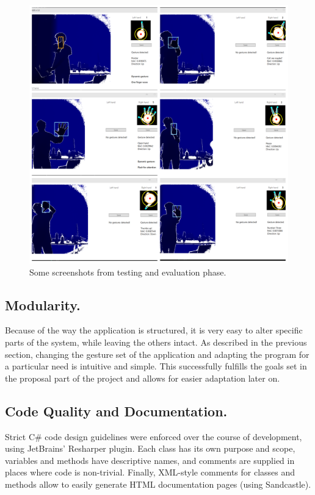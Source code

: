 \documentclass[a4paper,11pt,oneside]{article}
\begin{document}
\begin{figure}[H]
\centering
\includegraphics[scale=0.22]{result-screenshots.png}
\caption{Some screenshots from testing and evaluation phase.}
\end{figure}

\subsection{Modularity.}
Because of the way the application is structured, it is very easy to alter specific parts of the system, while leaving the others intact. As described in the previous section, changing the gesture set of the application and adapting the program for a particular need is intuitive and simple. This successfully fulfills the goals set in the proposal part of the project and allows for easier adaptation later on.

\subsection{Code Quality and Documentation.}
Strict C\# code design guidelines were enforced over the course of development, using JetBrains' Resharper plugin. Each class has its own  purpose and scope, variables and methods have descriptive names, and comments are supplied in places where code is non-trivial. Finally, XML-style comments for classes and methods allow to easily generate HTML documentation pages (using Sandcastle).
\end{document}
